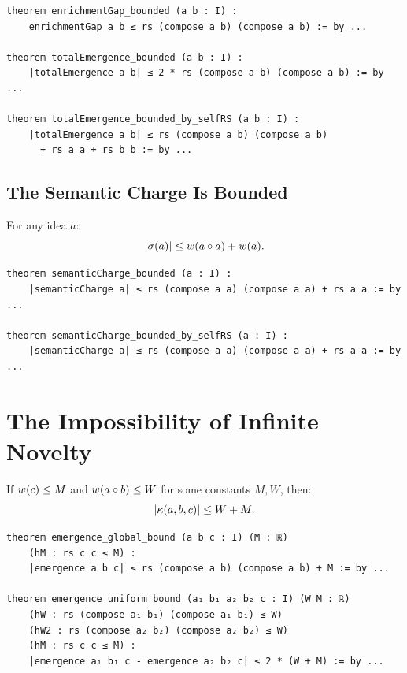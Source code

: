 \begin{lstlisting}[caption={Enrichment gap bounds (IDT\_v3\_Emergence.lean)}]
theorem enrichmentGap_bounded (a b : I) :
    enrichmentGap a b ≤ rs (compose a b) (compose a b) := by ...

theorem totalEmergence_bounded (a b : I) :
    |totalEmergence a b| ≤ 2 * rs (compose a b) (compose a b) := by ...

theorem totalEmergence_bounded_by_selfRS (a b : I) :
    |totalEmergence a b| ≤ rs (compose a b) (compose a b)
      + rs a a + rs b b := by ...
\end{lstlisting}


\subsection{The Semantic Charge Is Bounded}

\begin{theorem}
\label{thm:charge-bound}
For any idea $a$:
\[
  |\sigma(a)| \leq w(a \circ a) + w(a).
\]
\end{theorem}

\begin{lstlisting}[caption={Charge bounds (IDT\_v3\_Emergence.lean)}]
theorem semanticCharge_bounded (a : I) :
    |semanticCharge a| ≤ rs (compose a a) (compose a a) + rs a a := by ...

theorem semanticCharge_bounded_by_selfRS (a : I) :
    |semanticCharge a| ≤ rs (compose a a) (compose a a) + rs a a := by ...
\end{lstlisting}


\section{The Impossibility of Infinite Novelty}

\begin{theorem}
\label{thm:global-bound}
If $w(c) \leq M$ and $w(a \circ b) \leq W$ for some constants
$M, W$, then:
\[
  |\kappa(a, b, c)| \leq W + M.
\]
\end{theorem}

\begin{lstlisting}[caption={Global bounds (IDT\_v3\_Emergence.lean)}]
theorem emergence_global_bound (a b c : I) (M : ℝ)
    (hM : rs c c ≤ M) :
    |emergence a b c| ≤ rs (compose a b) (compose a b) + M := by ...

theorem emergence_uniform_bound (a₁ b₁ a₂ b₂ c : I) (W M : ℝ)
    (hW : rs (compose a₁ b₁) (compose a₁ b₁) ≤ W)
    (hW2 : rs (compose a₂ b₂) (compose a₂ b₂) ≤ W)
    (hM : rs c c ≤ M) :
    |emergence a₁ b₁ c - emergence a₂ b₂ c| ≤ 2 * (W + M) := by ...
\end{lstlisting}

